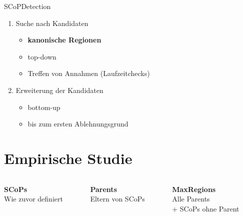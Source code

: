 \documentclass[aspectratio=169, xcolor=dvipsnames]{beamer}
\newcommand{\draftnote}[1]{{\color{red} \textbf{#1}}}
\begin{document}
\begin{frame}{SCoPDetection}
    \begin{enumerate}
        \item Suche nach Kandidaten
            \begin{itemize}
                \item \draftnote{kanonische Regionen}
                \item top-down
                \item Treffen von Annahmen (Laufzeitchecks)
            \end{itemize}
        \item Erweiterung der Kandidaten
            \begin{itemize}
                \item bottom-up
                \item bis zum ersten Ablehnungsgrund
            \end{itemize}
    \end{enumerate}
\end{frame}

\section{Empirische Studie}
{
    \begin{frame}
        \begin{columns}[T]
            \begin{column}{.33\textwidth}
                \centering
                \textbf{SCoPs}\\
                Wie zuvor definiert
            \end{column}\pause
            \begin{column}{.33\textwidth}
                \centering
                \textbf{Parents}\\
                Eltern von SCoPs
            \end{column}\pause
            \begin{column}{.33\textwidth}
                \centering
                \textbf{MaxRegions}\\
                Alle Parents\\
                + SCoPs ohne Parent
            \end{column}
        \end{columns}
    \end{frame}
}
\end{document}
